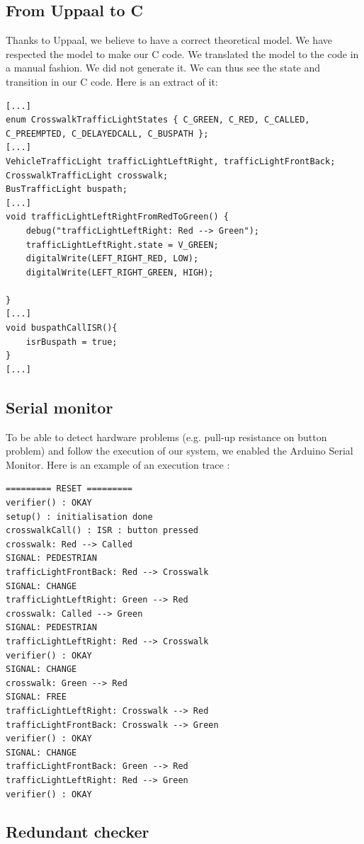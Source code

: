 \subsection{From Uppaal to C}

Thanks to Uppaal, we believe to have a correct theoretical model. We have respected the model to make our C code. We translated the model to the code in a manual fashion. We did not generate it.
We can thus see the state and transition in our C code. Here is an extract of it:

\begin{verbatim}
[...]
enum CrosswalkTrafficLightStates { C_GREEN, C_RED, C_CALLED, C_PREEMPTED, C_DELAYEDCALL, C_BUSPATH };
[...]
VehicleTrafficLight trafficLightLeftRight, trafficLightFrontBack;
CrosswalkTrafficLight crosswalk;
BusTrafficLight buspath;
[...]
void trafficLightLeftRightFromRedToGreen() {
    debug("trafficLightLeftRight: Red --> Green");
    trafficLightLeftRight.state = V_GREEN;
    digitalWrite(LEFT_RIGHT_RED, LOW);
    digitalWrite(LEFT_RIGHT_GREEN, HIGH);

}
[...]
void buspathCallISR(){
    isrBuspath = true;
}
[...]
\end{verbatim}


\subsection{Serial monitor}

To be able to detect hardware problems (e.g. pull-up resistance on button problem) and follow the execution of our system, we enabled the Arduino Serial Monitor. Here is an example of an execution trace :

\begin{verbatim}
========= RESET =========
verifier() : OKAY
setup() : initialisation done
crosswalkCall() : ISR : button pressed
crosswalk: Red --> Called
SIGNAL: PEDESTRIAN
trafficLightFrontBack: Red --> Crosswalk
SIGNAL: CHANGE
trafficLightLeftRight: Green --> Red
crosswalk: Called --> Green
SIGNAL: PEDESTRIAN
trafficLightLeftRight: Red --> Crosswalk
verifier() : OKAY
SIGNAL: CHANGE
crosswalk: Green --> Red
SIGNAL: FREE
trafficLightLeftRight: Crosswalk --> Red
trafficLightFrontBack: Crosswalk --> Green
verifier() : OKAY
SIGNAL: CHANGE
trafficLightFrontBack: Green --> Red
trafficLightLeftRight: Red --> Green
verifier() : OKAY
\end{verbatim}

\subsection{Redundant checker}

